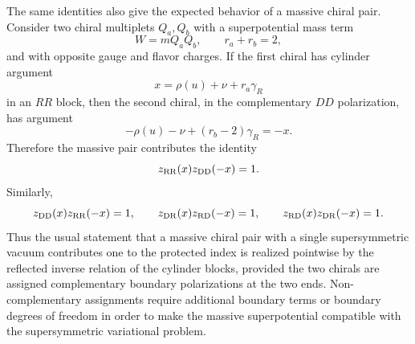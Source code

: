\documentclass[11pt,a4paper]{article}
\numberwithin{equation}{section}
\theoremstyle{plain}
\theoremstyle{definition}
\theoremstyle{remark}
\begin{document}
The same identities also give the expected behavior of a massive chiral pair.  Consider two chiral multiplets \(Q_a,Q_b\) with a superpotential mass term
\begin{equation}
W=m Q_a Q_b,
\qquad
r_a+r_b=2,
\label{eq:massive-pair-superpotential}
\end{equation}
and with opposite gauge and flavor charges.  If the first chiral has cylinder argument
\begin{equation}
x=\rho(u)+\nu+r_a\gamma_R
\label{eq:massive-pair-argument}
\end{equation}
in an \(RR\) block, then the second chiral, in the complementary \(DD\) polarization, has argument
\begin{equation}
-\rho(u)-\nu+(r_b-2)\gamma_R=-x .
\label{eq:massive-pair-opposite-argument}
\end{equation}
Therefore the massive pair contributes the identity
\begin{equation}
z_{\rm RR}(x)z_{\rm DD}(-x)=1.
\label{eq:massive-pair-RR-DD}
\end{equation}
Similarly,
\begin{equation}
z_{\rm DD}(x)z_{\rm RR}(-x)=1,
\qquad
z_{\rm DR}(x)z_{\rm RD}(-x)=1,
\qquad
z_{\rm RD}(x)z_{\rm DR}(-x)=1.
\label{eq:massive-pair-all-polarizations}
\end{equation}
Thus the usual statement that a massive chiral pair with a single supersymmetric vacuum contributes one to the protected index is realized pointwise by the reflected inverse relation of the cylinder blocks, provided the two chirals are assigned complementary boundary polarizations at the two ends.  Non-complementary assignments require additional boundary terms or boundary degrees of freedom in order to make the massive superpotential compatible with the supersymmetric variational problem.
\end{document}
